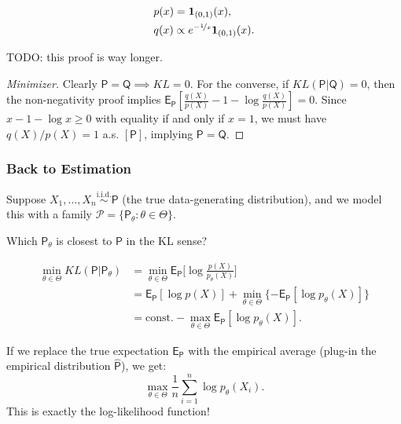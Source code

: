 \begin{ex}[]
    \begin{align*}
    &p(x) = \boldsymbol{1}_{(0,1)}(x),\\
    &q(x) \propto e^{-\nicefrac{1}{x}}\boldsymbol{1}_{(0,1)}(x).
    \end{align*}
\end{ex}

TODO: this proof is way longer.
\begin{proof}[Minimizer]
    Clearly $\mathsf{P}=\mathsf{Q} \implies KL=0$. For the converse, if $KL(\mathsf{P}|\mathsf{Q}) = 0$, then the non-negativity proof implies $\mathsf{E}_{\mathsf{P}}[\frac{q(X)}{p(X)} - 1 - \log\frac{q(X)}{p(X)}] = 0$. Since $x - 1 - \log x \ge 0$ with equality if and only if $x=1$, we must have $q(X)/p(X) = 1$ a.s. $[\mathsf{P}]$, implying $\mathsf{P}=\mathsf{Q}$.
\end{proof}

\subsubsection{Back to Estimation}
\label{sub:Back to Estimation}

Suppose $X_1, \dots, X_n \stackrel{\text{i.i.d.}}{\sim} \mathsf{P}$ (the true data-generating distribution), and we model this with a family $\mathcal{P} = \{\mathsf{P}_{\theta} : \theta \in \Theta\}$.

Which $\mathsf{P}_{\theta}$ is closest to $\mathsf{P}$ in the KL sense?


\[\begin{aligned} 
\min_{\theta \in \Theta} KL(\mathsf{P}|\mathsf{P}_{\theta}) &= \min_{\theta \in \Theta} \mathsf{E}_{\mathsf{P}} \Big[ \log \frac{p(X)}{p_{\theta}(X)} \Big] \\ 
&= \mathsf{E}_{\mathsf{P}} [\log p(X)] + \min_{\theta \in \Theta} \{ -\mathsf{E}_{\mathsf{P}} [\log p_{\theta}(X)] \} \\ 
&= \mathrm{const.} - \max_{\theta \in \Theta} \mathsf{E}_{\mathsf{P}} [\log p_{\theta}(X)]. 
\end{aligned}\]

If we replace the true expectation $\mathsf{E}_{\mathsf{P}}$ with the empirical average (plug-in the empirical distribution $\widehat{\mathsf{P}}$), we get:
\[
\max_{\theta \in \Theta} \frac{1}{n} \sum_{i=1}^{n} \log p_{\theta}(X_i).
\]
This is exactly the log-likelihood function!

